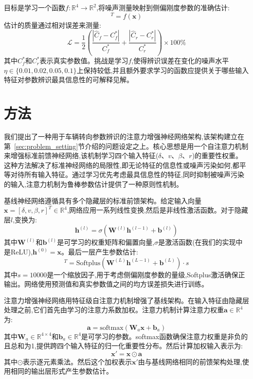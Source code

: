\documentclass[Afour,sageh,times]{sagej}
\begin{document}
目标是学习一个函数$f: \mathbb{R}^4 \rightarrow \mathbb{R}^2$,将噪声测量映射到侧偏刚度参数的准确估计:
\begin{equation}
[\hat{C}_f, \hat{C}_r]^T = f(\mathbf{x})
\end{equation}
估计的质量通过相对误差来测量:
\begin{equation}
\mathcal{L} = \frac{1}{2}\left(\frac{|\hat{C}_f - C_f^*|}{C_f^*} + \frac{|\hat{C}_r - C_r^*|}{C_r^*}\right) \times 100\%
\end{equation}
其中$C_f^*$和$C_r^*$表示真实参数值。挑战是学习$f$,使得辨识误差在变化的噪声水平$\eta \in \{0.01, 0.02, 0.05, 0.1\}$上保持较低,并且额外要求学习的函数应提供关于哪些输入特征对参数辨识最具信息性的可解释见解。

\section{方法}
\label{sec:method}

我们提出了一种用于车辆转向参数辨识的注意力增强神经网络架构,该架构建立在第~\ref{sec:problem_setting}节介绍的问题设定之上。核心思想是用一个自注意力机制来增强标准前馈神经网络,该机制学习四个输入特征($\delta$、$v$、$\beta$、$r$)的重要性权重。这种方法解决了标准神经网络的局限性,即无论特征的信息性或噪声污染如何,都平等对待所有输入特征。通过学习优先考虑最具信息性的特征,同时抑制被噪声污染的输入,注意力机制为鲁棒参数估计提供了一种原则性机制。

基线神经网络遵循具有多个隐藏层的标准前馈架构。给定输入向量$\mathbf{x} = [\delta, v, \beta, r]^T \in \mathbb{R}^4$,网络应用一系列线性变换,然后是非线性激活函数。对于隐藏层$l$,变换为:
\begin{equation}
\mathbf{h}^{(l)} = \sigma(\mathbf{W}^{(l)} \mathbf{h}^{(l-1)} + \mathbf{b}^{(l)})
\end{equation}
其中$\mathbf{W}^{(l)}$和$\mathbf{b}^{(l)}$是可学习的权重矩阵和偏置向量,$\sigma$是激活函数(在我们的实现中是ReLU),$\mathbf{h}^{(0)} = \mathbf{x}$。最后一层产生参数估计:
\begin{equation}
[\hat{C}_f, \hat{C}_r]^T = \text{Softplus}(\mathbf{W}^{(L)} \mathbf{h}^{(L-1)} + \mathbf{b}^{(L)}) \cdot s
\end{equation}
其中$s = 10000$是一个缩放因子,用于考虑侧偏刚度参数的量级,Softplus激活确保正输出。网络使用预测值和真实参数值之间的均方误差损失进行训练。

注意力增强神经网络用特征级自注意力机制增强了基线架构。在输入特征由隐藏层处理之前,它们首先由学习的注意力系数加权。注意力机制计算注意力权重$\mathbf{a} \in \mathbb{R}^4$为:
\begin{equation}
\mathbf{a} = \text{softmax}(\mathbf{W}_a \mathbf{x} + \mathbf{b}_a)
\end{equation}
其中$\mathbf{W}_a \in \mathbb{R}^{4 \times 4}$和$\mathbf{b}_a \in \mathbb{R}^4$是可学习的参数。softmax函数确保注意力权重是非负的且总和为1,提供跨四个输入特征的归一化重要性分布。然后计算加权输入表示为:
\begin{equation}
\mathbf{x}' = \mathbf{x} \odot \mathbf{a}
\end{equation}
其中$\odot$表示逐元素乘法。然后这个加权表示$\mathbf{x}'$由与基线网络相同的前馈架构处理,使用相同的输出层形式产生参数估计。
\end{document}
